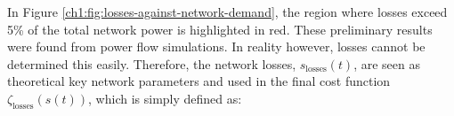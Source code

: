 
In Figure \ref{ch1:fig:losses-against-network-demand}, the region where losses exceed 5\% of the total network power is highlighted in red.
These preliminary results were found from power flow simulations.
In reality however, losses cannot be determined this easily.
Therefore, the network losses, $s_\text{losses}(t)$, are seen as theoretical key network parameters and used in the final cost function $\zeta_\text{losses}(s(t))$, which is simply defined as:



